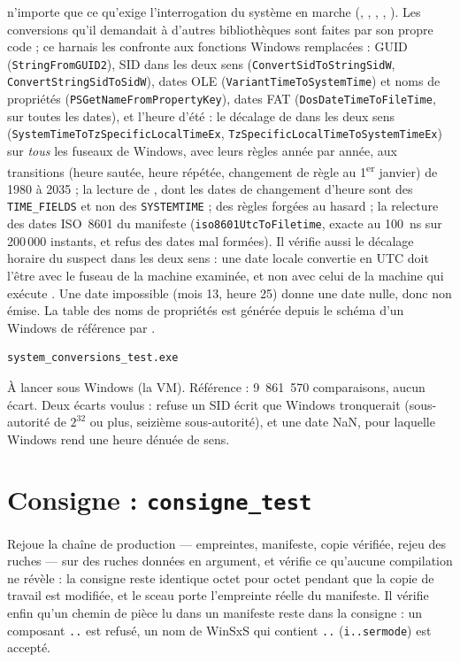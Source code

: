 \documentclass[11pt,a4paper,oneside]{report}
\begin{document}
\wac{} n'importe que ce qu'exige l'interrogation du système en marche
(, , , ,
). Les conversions qu'il demandait à d'autres bibliothèques
sont faites par son propre code ; ce harnais les confronte aux fonctions
Windows remplacées : GUID (\texttt{StringFromGUID2}), SID dans les deux sens
(\texttt{ConvertSidToStringSidW}, \texttt{ConvertStringSidToSidW}), dates OLE
(\texttt{VariantTimeToSystemTime}) et noms de propriétés
(\texttt{PSGetNameFromPropertyKey}), dates FAT
(\texttt{DosDateTimeToFileTime}, sur toutes les dates), et l'heure d'été :
le décalage de \wac{} dans les deux sens (\texttt{SystemTimeToTzSpecificLocalTimeEx},
\texttt{TzSpecificLocalTimeToSystemTimeEx}) sur \emph{tous} les fuseaux de
Windows, avec leurs règles année par année, aux transitions (heure sautée,
heure répétée, changement de règle au 1\textsuperscript{er} janvier) de 1980
à 2035 ; la lecture de , dont les dates de changement d'heure sont des
\texttt{TIME\_FIELDS} et non des \texttt{SYSTEMTIME} ; des règles forgées au
hasard ; la relecture des dates ISO~8601 du manifeste (\texttt{iso8601UtcToFiletime},
exacte au 100~ns sur 200\,000 instants, et refus des dates mal formées). Il vérifie aussi le
décalage horaire du suspect dans les deux sens : une date locale convertie en
UTC doit l'être avec le fuseau de la machine examinée, et non avec celui de la
machine qui exécute \wac{}. Une date impossible (mois 13, heure 25) donne une
date nulle, donc non émise. La table des noms de propriétés est
générée depuis le schéma d'un Windows de référence par
.

\begin{lstlisting}
system_conversions_test.exe
\end{lstlisting}

À lancer sous Windows (la VM). Référence : 9~861~570 comparaisons, aucun écart.
Deux écarts voulus : \wac{} refuse un SID écrit que Windows tronquerait
(sous-autorité de $2^{32}$ ou plus, seizième sous-autorité), et une date NaN,
pour laquelle Windows rend une heure dénuée de sens.

\section{Consigne : \texttt{consigne\_test}}

Rejoue la chaîne de production — empreintes, manifeste, copie vérifiée, rejeu
des ruches — sur des ruches données en argument, et vérifie ce qu'aucune
compilation ne révèle : la consigne reste identique octet pour octet pendant que
la copie de travail est modifiée, et le sceau porte l'empreinte réelle du
manifeste. Il vérifie enfin qu'un chemin de pièce lu dans un manifeste reste
dans la consigne : un composant \texttt{..} est refusé, un nom de WinSxS qui
contient \texttt{..} (\texttt{i..sermode}) est accepté.
\end{document}
